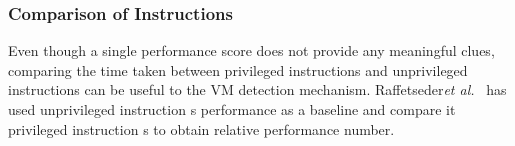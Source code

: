 \subsubsection{Comparison of Instructions}
Even though a single performance score does not provide any meaningful clues, comparing the time taken between privileged instructions and unprivileged instructions can be useful to the VM detection mechanism. Raffetseder{\em et al.}~\cite{raffetseder2007} has used unprivileged instruction \textquotesingle s performance as a baseline and compare it privileged instruction \textquotesingle s to obtain relative performance number.


